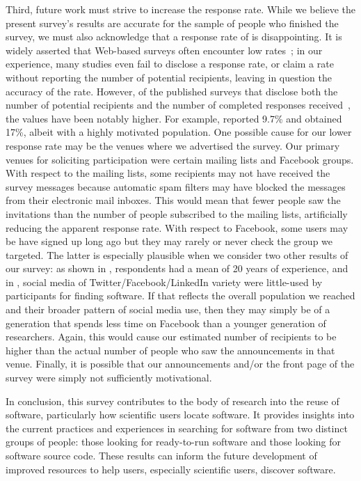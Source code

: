 \documentclass{casicswhitepaper}
\begin{document}
Third, future work must strive to increase the response rate.  While we believe the present survey's results are accurate for the sample of people who finished the survey, we must also acknowledge that a response rate of \populationResponseRate is disappointing.  It is widely asserted that Web-based surveys often encounter low rates~\cite[e.g.,][]{kitchenham_2008, couper2000review, couper2008web}; in our experience, many studies even fail to disclose a response rate, or claim a rate without reporting the number of potential recipients, leaving in question the accuracy of the rate.  However, of the published surveys that disclose both the number of potential recipients and the number of completed responses received~\cite[e.g.,][]{wu2007empirical, bauer2014exploratory, kalliamvakou_2014, lawrence2014who, sojer2010reusing}, the values have been notably higher.  For example, \citet{sojer2010reusing} reported 9.7\% and \citet{lawrence2015science} obtained 17\%, albeit with a highly motivated population.  One possible cause for our lower response rate may be the venues where we advertised the survey.  Our primary venues for soliciting participation were certain mailing lists and Facebook groups.  With respect to the mailing lists, some recipients may not have received the survey messages because automatic spam filters may have blocked the messages from their electronic mail inboxes.  This would mean that fewer people saw the invitations than the number of people subscribed to the mailing lists, artificially reducing the apparent response rate.  With respect to Facebook, some users may be have signed up long ago but they may rarely or never check the group we targeted.  The latter is especially plausible when we consider two other results of our survey: as shown in , respondents had a mean of 20 years of experience, and in , social media of Twitter/Facebook/LinkedIn variety were little-used by participants for finding software.  If that reflects the overall population we reached and their broader pattern of social media use, then they may simply be of a generation that spends less time on Facebook than a younger generation of researchers.  Again, this would cause our estimated number of recipients to be higher than the actual number of people who saw the announcements in that venue.  Finally, it is possible that our announcements and/or the front page of the survey were simply not sufficiently motivational.

In conclusion, this survey contributes to the body of research into the reuse of software, particularly how scientific users locate software.  It provides insights into the current practices and experiences in searching for software from two distinct groups of people: those looking for ready-to-run software and those looking for software source code.  These results can inform the future development of improved resources to help users, especially scientific users, discover software.
\end{document}
